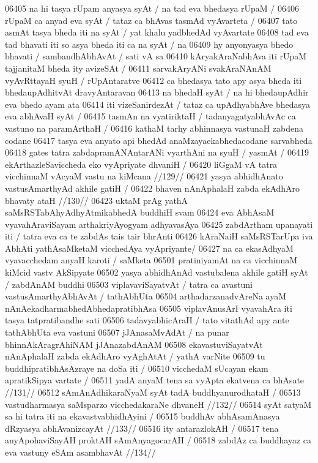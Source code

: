 06405 na hi tasya rUpam anyasya syAt / na tad eva bhedasya rUpaM /  
06406 rUpaM ca anyad eva syAt / tataz ca bhAvas tasmAd vyAvarteta /  
06407 tato asmAt tasya bheda iti na syAt / yat khalu yadbhedAd vyAvartate  
06408 tad eva tad bhavati iti so asya bheda iti ca na syAt / na 
06409 hy anyonyasya bhedo bhavati / sambandhAbhAvAt / sati vA sa  
06410 kAryakAraNabhAva iti rUpaM tajjanitaM bheda ity avizeSAt / 
06411 sarvakAryANi svakAraNAnAM vyAvRttayaH syuH / rUpAntaratve
06412 ca bhedasya tato apy asya bheda iti bhedaupAdhitvAt dravyAntaravan  
06413 na bhedaH syAt / na hi bhedaupAdhir eva bhedo ayam ata  
06414 iti vizeSanirdezAt / tataz ca upAdhyabhAve bhedasya eva abhAvaH syAt /
06415 tasmAn na vyatiriktaH / tadanyagatyabhAvAc ca vastuno na  paramArthaH /
06416 kathaM tarhy abhinnasya vastunaH zabdena codane
06417 tasya eva anyato api bhedAd anaMzayaekabhedacodane sarvabheda 
06418 gates tatra zabdapramANAntarANi vyarthAni na syuH / yasmAt / 
06419 	ekArthazleSaviccheda eko vyApriyate dhvaniH / 
06420 	liGgaM vA tatra vicchinnaM vAcyaM vastu na kiMcana //129//
06421 	yasya abhidhAnato vastusAmarthyAd akhile gatiH /  
06422 	bhaven nAnAphalaH zabda ekAdhAro bhavaty ataH //130//
06423 uktaM prAg yathA saMsRSTabAhyAdhyAtmikabhedA buddhiH svam  
06424 eva AbhAsaM vyavahAraviSayam arthakriyAyogyam adhyavasAya 
06425 zabdArtham upanayati iti / tatra eva ca te zabdAs tais tair bhrAnti 
06426 kAraNaiH saMsRSTarUpa iva AbhAti yathAsaMketaM vicchedAya vyApriyante/
06427 na ca ekasAdhyaM vyavacchedam anyaH karoti / saMketa 
06501 pratiniyamAt na ca vicchinnaM kiMcid vastv AkSipyate  
06502 yasya abhidhAnAd vastubalena akhile gatiH syAt / zabdAnAM buddhi
06503 viplavaviSayatvAt / tatra ca avastuni vastusAmarthyAbhAvAt / tathAbhUta
06504 arthadarzanadvAreNa ayaM nAnAekadharmabhedAbhedapratibhAsa
06505 viplavAnusArI vyavahAra iti tasya tatpratibandhe sati
06506 tadavyabhicAraH / tato vitathAd apy ante tathAbhUta eva vastuni
06507 jJAnasaMvAdAt / na punar bhinnAkAragrAhiNAM jJAnazabdAnAM  
06508 ekavastuviSayatvAt nAnAphalaH zabda ekAdhAro vyAghAtAt / yathA varNite
06509 tu buddhipratibhAsAzraye na doSa iti / 
06510 	vicchedaM sUcayan ekam apratikSipya vartate /  
06511 	yadA anyaM tena sa vyApta ekatvena ca bhAsate //131// 
06512 	sAmAnAdhikaraNyaM syAt tadA buddhyanurodhataH / 
06513 	vastudharmasya saMsparzo vicchedakaraNe dhvaneH //132//
06514 	syAt satyaM sa hi tatra iti na ekavastvabhidhAyini / 
06515 	buddhAv abhAsamAnasya dRzyasya abhAvanizcayAt //133// 
06516 ity antarazlokAH / 
06517 	tena anyApohaviSayAH proktAH sAmAnyagocarAH / 
06518 	zabdAz ca buddhayaz ca eva vastuny eSAm asambhavAt //134//  
